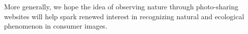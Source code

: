 More generally, we hope
the idea of observing nature through photo-sharing websites will help
spark renewed interest in recognizing natural and ecological phenomenon in
consumer images.



 






